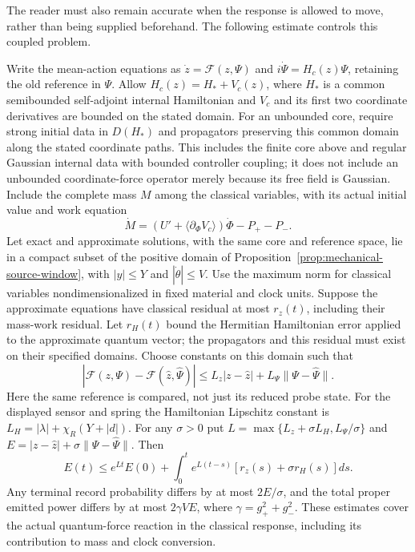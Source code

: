 The reader must also remain accurate when the response is allowed to
move, rather than being supplied beforehand. The following estimate
controls this coupled problem.

\begin{proposition}
\label{prop:coupled-return-tolerance}
Write the mean-action equations as
$\dot z=\mathcal F(z,\Psi)$ and $i\dot\Psi=H_c(z)\Psi$,
retaining the old reference in $\Psi$.
Allow $H_c(z)=H_*+V_c(z)$, where $H_*$ is a common semibounded self-adjoint
internal Hamiltonian and $V_c$ and its first two coordinate derivatives
are bounded on the stated domain. For an unbounded core, require strong
initial data in $D(H_*)$ and propagators preserving this common domain
along the stated coordinate paths. This includes the finite core above
and regular Gaussian internal data with bounded controller coupling;
it does not include an unbounded coordinate-force operator merely
because its free field is Gaussian. Include the complete mass $M$
among the classical variables,
with its actual initial value and work equation
\[
 \dot M=(U'+\langle\partial_\Phi V_c\rangle)\dot\Phi-P_+-P_-.
\]
Let exact and approximate solutions, with the same core and
reference space, lie in a compact subset of the positive domain of
Proposition~\ref{prop:mechanical-source-window}, with
$|y|\le Y$ and $|\dot\theta|\le V$.
Use the maximum norm for classical variables nondimensionalized in
fixed material and clock units. Suppose the
approximate equations have classical residual at most $r_z(t)$,
including their mass-work residual. Let $r_H(t)$ bound the Hermitian
Hamiltonian error applied to the approximate quantum vector; the
propagators and this residual must exist on their specified domains.
Choose constants on this domain such that
\[
 |\mathcal F(z,\Psi)-\mathcal F(\widehat z,\widehat\Psi)|
 \le L_z|z-\widehat z|+L_\Psi\|\Psi-\widehat\Psi\|.
\]
Here the same reference is compared, not just its reduced probe state.
For the displayed sensor and spring the Hamiltonian Lipschitz constant is
$L_H=|\lambda|+\chi_R(Y+|d|)$.
For any $\sigma>0$ put
$L=\max\{L_z+\sigma L_H,L_\Psi/\sigma\}$ and
$E=|z-\widehat z|+\sigma\|\Psi-\widehat\Psi\|$.
Then
\begin{equation}
 E(t)\le e^{Lt}E(0)+\int_0^t e^{L(t-s)}
                   [r_z(s)+\sigma r_H(s)]ds.
 \label{eq:coupled-return-error}
\end{equation}
Any terminal record probability differs by at most $2E/\sigma$,
and the total proper emitted power differs by at most $2\gamma VE$,
where $\gamma=g_+^2+g_-^2$.
These estimates cover the actual quantum-force reaction in the classical
response, including its contribution to mass and clock conversion.
\end{proposition}
